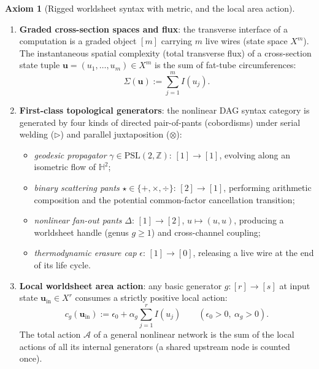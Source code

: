 \documentclass[11pt,a4paper]{article}
\theoremstyle{definition}
\newtheorem{axiom}{Axiom}[section]
\theoremstyle{remark}
\newcommand{\HH}{\mathbb{H}}
\newcommand{\ZZ}{\mathbb{Z}}
\newcommand{\cA}{\mathcal{A}}
\begin{document}
\begin{axiom}[Rigged worldsheet syntax with metric, and the local area action]
\label{ax:syntax}
\begin{enumerate}
\item \textbf{Graded cross-section spaces and flux}: the transverse interface of
a computation is a graded object $[m]$ carrying $m$ live wires (state space
$X^m$).  The instantaneous spatial complexity (total transverse flux) of a
cross-section state tuple $\mathbf{u} = (u_1, \dots, u_m) \in X^m$ is the sum of
fat-tube circumferences:
\[
\Sigma(\mathbf{u}) := \sum_{j=1}^m I(u_j).
\]
\item \textbf{First-class topological generators}: the nonlinear DAG syntax
category is generated by four kinds of directed pair-of-pants (cobordisms) under
serial welding ($\rhd$) and parallel juxtaposition ($\otimes$):
\begin{itemize}
\item \emph{geodesic propagator} $\gamma \in \mathrm{PSL}(2, \ZZ)$: $[1] \to
[1]$, evolving along an isometric flow of $\HH^2$;
\item \emph{binary scattering pants} $\star \in \{+, \times, \div\}$: $[2] \to
[1]$, performing arithmetic composition and the potential common-factor
cancellation transition;
\item \emph{nonlinear fan-out pants} $\Delta$: $[1] \to [2]$, $u \mapsto (u,u)$,
producing a worldsheet handle (genus $g \ge 1$) and cross-channel coupling;
\item \emph{thermodynamic erasure cap} $\epsilon$: $[1] \to [0]$, releasing a
live wire at the end of its life cycle.
\end{itemize}
\item \textbf{Local worldsheet area action}: any basic generator $g: [r] \to [s]$
at input state $\mathbf{u}_{\mathrm{in}} \in X^r$ consumes a strictly positive
local action:
\[
c_g(\mathbf{u}_{\mathrm{in}}) := \epsilon_0 + \alpha_g \sum_{j=1}^r I(u_j)
\qquad (\epsilon_0 > 0,\ \alpha_g > 0).
\]
The total action $\cA$ of a general nonlinear network is the sum of the local
actions of all its internal generators (a shared upstream node is counted once).
\end{enumerate}
\end{axiom}
\end{document}
